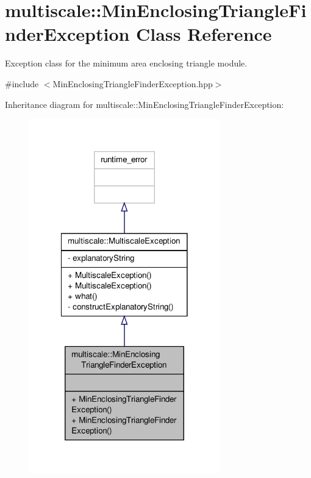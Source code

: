 \hypertarget{classmultiscale_1_1MinEnclosingTriangleFinderException}{\section{multiscale\-:\-:Min\-Enclosing\-Triangle\-Finder\-Exception Class Reference}
\label{classmultiscale_1_1MinEnclosingTriangleFinderException}
}


Exception class for the minimum area enclosing triangle module.  




{\ttfamily \#include $<$Min\-Enclosing\-Triangle\-Finder\-Exception.\-hpp$>$}



Inheritance diagram for multiscale\-:\-:Min\-Enclosing\-Triangle\-Finder\-Exception\-:
\nopagebreak
\begin{figure}[H]
\begin{center}
\leavevmode
\includegraphics[width=234pt]{classmultiscale_1_1MinEnclosingTriangleFinderException__inherit__graph}
\end{center}
\end{figure}


